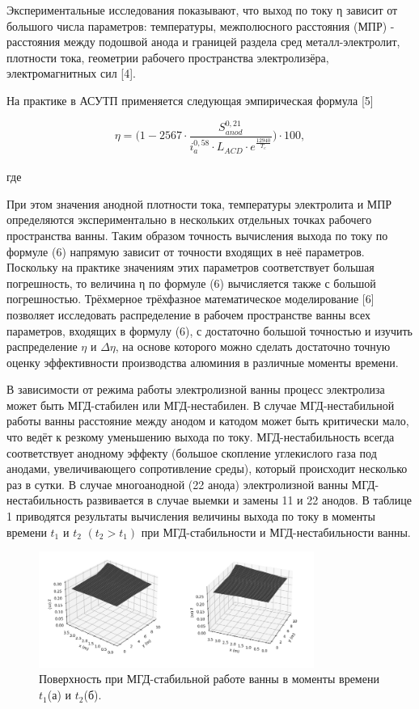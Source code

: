 \documentclass{article}
\begin{document}
Экспериментальные исследования показывают, что выход по току η зависит от большого числа параметров: температуры, межполюсного расстояния (МПР) - расстояния между подошвой анода и границей раздела сред металл-электролит, плотности тока, геометрии рабочего пространства электролизёра, электромагнитных сил [4].

На практике в АСУТП применяется следующая эмпирическая формула [5] 

\[ \eta = \bigg(1-2567 \cdot \frac{S^{0,21}_{anod}}{i^{0,58}_{a}\cdot L_{ACD} \cdot e^{\frac{12940}{T_e}}}\bigg) \cdot 100, \]
\\
где 

При этом значения анодной плотности тока, температуры электролита и МПР определяются экспериментально в нескольких отдельных точках рабочего пространства ванны.
Таким образом точность вычисления выхода по току по формуле (6) напрямую зависит от точности входящих в неё параметров. Поскольку на практике значениям этих параметров соответствует большая погрешность, то величина η по формуле (6) вычисляется также с большой погрешностью. Трёхмерное трёхфазное математическое моделирование [6] позволяет исследовать распределение в рабочем пространстве ванны всех параметров, входящих в формулу (6), с достаточно большой точностью и изучить распределение $\eta$ и $\Delta\eta$, на основе которого можно сделать достаточно точную оценку эффективности производства алюминия в различные моменты времени.

В зависимости от режима работы электролизной ванны процесс электролиза может быть МГД-стабилен или МГД-нестабилен. В случае МГД-нестабильной работы ванны расстояние между анодом и катодом может быть критически мало, что ведёт к резкому уменьшению выхода по току. МГД-нестабильность всегда соответствует анодному эффекту (большое скопление углекислого газа под анодами, увеличивающего сопротивление среды), который происходит несколько раз в сутки. В случае многоанодной (22 анода) электролизной ванны МГД-нестабильность развивается в случае выемки и замены 11 и 22 анодов. В таблице 1 приводятся результаты вычисления величины выхода по току в моменты времени $t_1$ и $t_2$ $(t_2>t_1)$ при МГД-стабильности и МГД-нестабильности ванны. 


\begin{figure}[h!]
    \centering
    \includegraphics[width=90mm]{спокойная поверхность.png}
    \caption{Поверхность при МГД-стабильной работе ванны в моменты времени $t_1$(а) и $t_2$(б).}
    \label{fig:} 
\end{figure}
\end{document}
